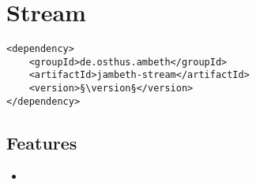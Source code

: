 \section{Stream}
\label{module:Stream}
\ClearAPI
\TODO
\begin{lstlisting}[style=POM,caption={Maven modules to use \emph{Ambeth Stream}}]
<dependency>
	<groupId>de.osthus.ambeth</groupId>
	<artifactId>jambeth-stream</artifactId>
	<version>§\version§</version>
</dependency>
\end{lstlisting}
\subsection{Features}
\begin{itemize}
	\item \TODO
\end{itemize}

